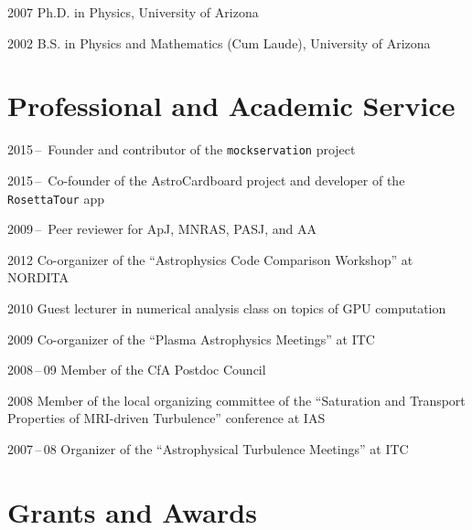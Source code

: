 \begin{tlist}

\item[2007] Ph.D. in Physics, University of Arizona

\item[2002] B.S. in Physics and Mathematics (Cum Laude), University of Arizona

\end{tlist}

\section*{Professional and Academic Service}

\begin{tlist}

\item[2015\,--\,] Founder and contributor of the
  \texttt{mockservation} project

\item[2015\,--\,] Co-founder of the AstroCardboard project and
  developer of the \texttt{RosettaTour} app

\item[2009\,--\,] Peer reviewer for ApJ, MNRAS, PASJ, and AA

\item[2012] Co-organizer of the ``Astrophysics Code Comparison
  Workshop'' at NORDITA

\item[2010] Guest lecturer in numerical analysis class on topics of
  GPU computation

\item[2009] Co-organizer of the ``Plasma Astrophysics Meetings'' at ITC

\item[2008\,--\,09] Member of the CfA Postdoc Council

\item[2008] Member of the local organizing committee of the
  ``Saturation and Transport Properties of MRI-driven Turbulence''
  conference at IAS

\item[2007\,--\,08] Organizer of the ``Astrophysical Turbulence
  Meetings'' at ITC

\end{tlist}

\section*{Grants and Awards}

